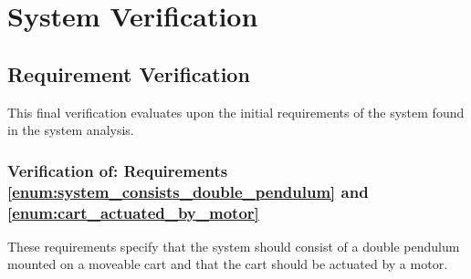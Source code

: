 \section{System Verification}
\label{sec:system_verification}

\subsection{Requirement Verification} %
\label{sub:requirement_verification}
This final verification evaluates upon the initial requirements of the system found in the system analysis.
\subsubsection{Verification of: Requirements \ref{enum:system_consists_double_pendulum} and \ref{enum:cart_actuated_by_motor}} %
\label{sub:verification_of_requirement_enum:system_consists_double_pendulum}
These requirements specify that the system should consist of a double pendulum mounted on a moveable cart and that the cart should be actuated by a motor.

